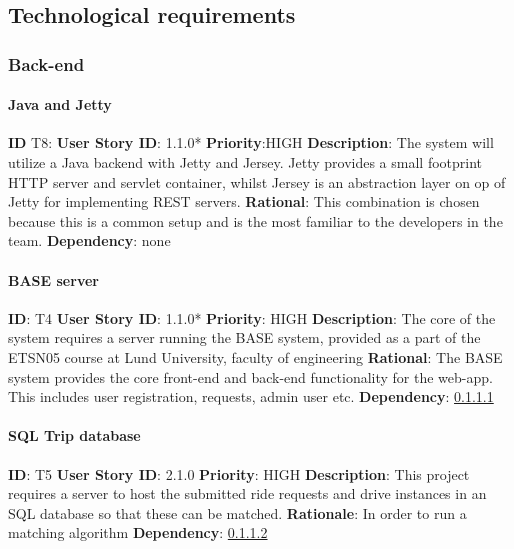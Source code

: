 \documentclass{article}
\begin{document}
\subsection{Technological requirements}

\subsubsection{Back-end}

\paragraph{Java and Jetty}\label{req:javaandjetty}
\textbf{ID} T8: \newline
\textbf{User Story ID}: 1.1.0* \newline
\textbf{Priority}:HIGH \newline
\textbf{Description}: The system will utilize a Java backend with Jetty and Jersey. Jetty provides a small footprint HTTP server and servlet container, whilst Jersey is an abstraction layer on op of Jetty for implementing REST servers. \newline
\textbf{Rational}: This combination is chosen because this is a common setup and is the most familiar to the developers in the team.\newline
\textbf{Dependency}: none\newline

\paragraph{BASE server}\label{req:base}
\textbf{ID}: T4\newline
\textbf{User Story ID}: 1.1.0* \newline
\textbf{Priority}: HIGH\newline
\textbf{Description}: The core of the system requires a server running the BASE system, provided as a part of the ETSN05 course at Lund University, faculty of engineering\newline
\textbf{Rational}: The BASE system provides the core front-end and back-end functionality for the web-app. This includes user registration, requests, admin user etc.\newline
\textbf{Dependency}: \ref{req:javaandjetty}\newline

\paragraph{SQL Trip database}\label{req:tripDatabase}
\textbf{ID}: T5\newline
\textbf{User Story ID}: 2.1.0\newline
\textbf{Priority}: HIGH\newline
\textbf{Description}: This project requires a server to host the submitted ride requests and drive instances in an SQL database so that these can be matched.\newline
\textbf{Rationale}: In order to run a matching algorithm\newline
\textbf{Dependency}: \ref{req:base}
\end{document}

